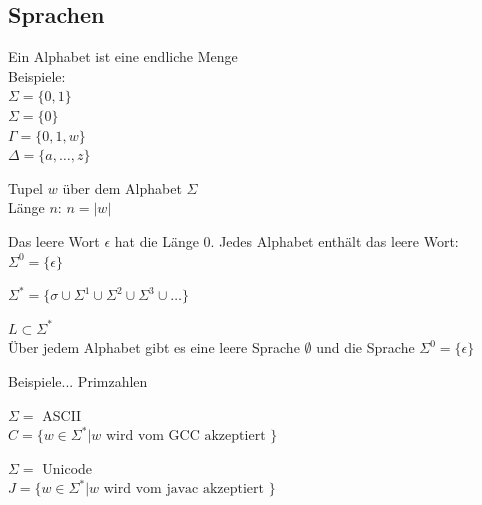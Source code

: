 \documentclass[a4paper]{article}
\begin{document}
\subsection{Sprachen}
	\begin{multicols}{2}	
	
	\begin{fdef}[Alphabet]
	Ein Alphabet ist eine endliche Menge \\
	Beispiele: \\
	$\Sigma = \{ 0,1 \}$ \\
	$\Sigma = \{ 0 \}$ \\
	$\Gamma = \{ 0,1,w \}$ \\
	$\Delta = \{ a, \dots, z \}$ \\
	\end{fdef}
	\begin{fdef}[Wort]
		Tupel $w$ über dem Alphabet $\Sigma$ \\
		Länge $n$: $n = |w|$
	\end{fdef}
	\begin{fdef}
		Das leere Wort $\epsilon$ hat die Länge 0.
		Jedes Alphabet enthält das leere Wort: $\Sigma^0 = \{\epsilon \}$
	\end{fdef}
	\begin{fdef}
		$\Sigma^* = \{ \sigma \cup \Sigma^1 \cup \Sigma^2 \cup \Sigma^3 \cup \dots \}$
	\end{fdef}
	\begin{fdef}[Sprache $L$]
		$L \subset \Sigma^*$ \\
		Über jedem Alphabet gibt es eine leere Sprache $\emptyset$ und die Sprache $\Sigma^0 = \{\epsilon \}$
	\end{fdef}
	
	Beispiele... Primzahlen
	
	\begin{fmerke}[C-Standard]
		$\Sigma = $ ASCII \\
		$C = \{w \in \Sigma^* | w \text{ wird vom GCC akzeptiert } \}$
	\end{fmerke}
	\begin{fmerke}[Java]
		$\Sigma = $ Unicode \\
		$J = \{w \in \Sigma^* | w \text{ wird vom javac akzeptiert } \}$
	\end{fmerke}

	\end{multicols}
	

\newpage
\end{document}
